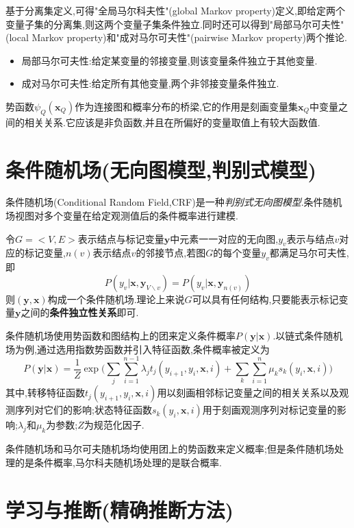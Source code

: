 基于分离集定义,可得"全局马尔科夫性"(global Markov property)定义,即给定两个变量子集的分离集,则这两个变量子集条件独立.同时还可以得到"局部马尔可夫性"(local Markov property)和"成对马尔可夫性"(pairwise Markov property)两个推论.

\begin{itemize}
\item 局部马尔可夫性:给定某变量的邻接变量,则该变量条件独立于其他变量.
\item 成对马尔可夫性:给定所有其他变量,两个非邻接变量条件独立.
\end{itemize}

势函数$\psi_Q(\bm x_Q)$作为连接图和概率分布的桥梁,它的作用是刻画变量集$\bm x_Q$中变量之间的相关关系.它应该是非负函数,并且在所偏好的变量取值上有较大函数值.

\section{条件随机场(无向图模型,判别式模型)}

条件随机场(Conditional Random Field,CRF)是一种\textit{判别式无向图模型}.条件随机场视图对多个变量在给定观测值后的条件概率进行建模.

令$G=<V,E>$表示结点与标记变量$\bm y$中元素一一对应的无向图,$y_v$表示与结点$v$对应的标记变量,$n(v)$表示结点$v$的邻接节点,若图$G$的每个变量$y_v$都满足马尔可夫性,即
\begin{equation}
P(y_v|\bm x,\bm y_{V\backslash v})=P(y_v|\bm x,\bm y_{n(v)})
\end{equation}
则$(\bm y, \bm x)$构成一个条件随机场.理论上来说$G$可以具有任何结构,只要能表示标记变量$\bm y$之间的\textbf{条件独立性关系}即可.

条件随机场使用势函数和图结构上的团来定义条件概率$P(\bm y|\bm x)$.以链式条件随机场为例,通过选用指数势函数并引入特征函数,条件概率被定义为
\begin{equation}
P(\bm y|\bm x)=\frac{1}{Z}\exp\Big(\sum_j\sum_{i=1}^{n-1}\lambda_jt_j(y_{i+1},y_i,\bm x, i)+\sum_k\sum_{i=1}^n\mu_ks_k(y_i,\bm x,i)\Big)
\end{equation}
其中,转移特征函数$t_j(y_{i+1},y_i,\bm x, i)$用以刻画相邻标记变量之间的相关关系以及观测序列对它们的影响;状态特征函数$s_k(y_i,\bm x,i)$用于刻画观测序列对标记变量的影响;$\lambda_j$和$\mu_k$为参数;$Z$为规范化因子.

条件随机场和马尔可夫随机场均使用团上的势函数来定义概率;但是条件随机场处理的是条件概率,马尔科夫随机场处理的是联合概率.

\section{学习与推断(精确推断方法)}

